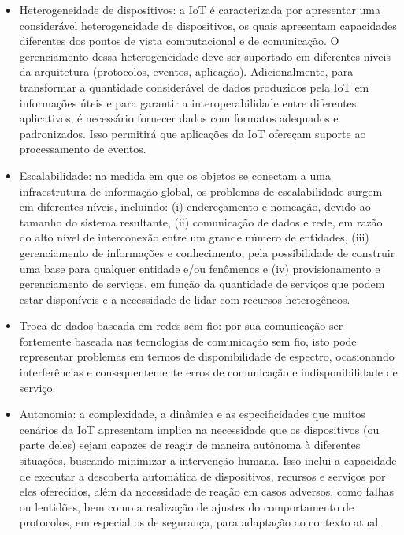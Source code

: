 \documentclass[tid,table]{texufpel} %
\begin{document}
\begin{itemize}

\item Heterogeneidade de dispositivos: a IoT é caracterizada por apresentar uma considerável heterogeneidade de dispositivos, os quais apresentam capacidades diferentes dos pontos de vista computacional e de comunicação. O gerenciamento dessa heterogeneidade deve ser suportado em diferentes níveis da arquitetura (protocolos, eventos, aplicação). Adicionalmente, para transformar a quantidade considerável de dados produzidos pela IoT em informações úteis e para garantir a interoperabilidade entre diferentes aplicativos, é necessário fornecer dados com formatos adequados e padronizados. Isso permitirá que aplicações da IoT ofereçam suporte ao processamento de eventos.

\item Escalabilidade: na medida em que os objetos se conectam a uma infraestrutura de informação global, os problemas de escalabilidade surgem em diferentes níveis, incluindo: (i) endereçamento e nomeação, devido ao tamanho do sistema resultante, (ii) comunicação de dados e rede, em razão do alto nível de interconexão entre um grande número de entidades, (iii) gerenciamento de informações e conhecimento, pela possibilidade de construir uma base para qualquer entidade e/ou fenômenos e (iv) provisionamento e gerenciamento de serviços, em função da quantidade de serviços que podem estar disponíveis e a necessidade de lidar com recursos heterogêneos.

\item Troca de dados baseada em redes sem fio: por sua comunicação ser fortemente baseada nas tecnologias de comunicação sem fio, isto pode representar problemas em termos de disponibilidade de espectro, ocasionando interferências e consequentemente erros de comunicação e indisponibilidade de serviço.

\item Autonomia: a complexidade, a dinâmica e as especificidades que muitos cenários da IoT apresentam implica na necessidade que os dispositivos (ou parte deles) sejam capazes de reagir de maneira autônoma à diferentes situações, buscando minimizar a intervenção humana. Isso inclui a capacidade de executar a descoberta automática de dispositivos, recursos e serviços por eles oferecidos, além da necessidade de reação em casos adversos, como falhas ou lentidões, bem como a realização de ajustes do comportamento de protocolos, em especial os de segurança, para adaptação ao contexto atual.


\end{itemize}
\end{document}
